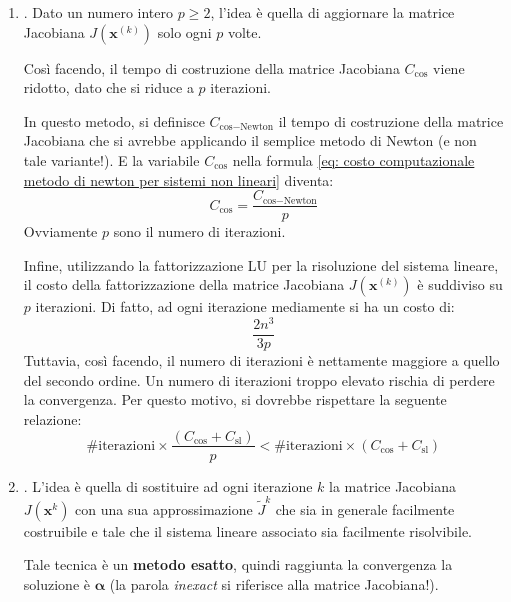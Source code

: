 \begin{enumerate}
	\item {}. Dato un numero intero $p \ge 2$, l'idea è quella di aggiornare la matrice Jacobiana $J\left(\mathbf{x}^{\left(k\right)}\right)$ solo ogni $p$ volte.
	
	Così facendo, il tempo di costruzione della matrice Jacobiana $C_{\text{cos}}$ viene ridotto, dato che si riduce a $p$ iterazioni.
	
	In questo metodo, si definisce $C_{\text{cos} - \text{Newton}}$ il tempo di costruzione della matrice Jacobiana che si avrebbe applicando il semplice metodo di Newton (e non tale variante!). E la variabile $C_{\text{cos}}$ nella formula \ref{eq: costo computazionale metodo di newton per sistemi non lineari} diventa:
	\begin{equation}
		C_{\text{cos}} = \dfrac{C_{\text{cos} - \text{Newton}}}{p}
	\end{equation}
	Ovviamente $p$ sono il numero di iterazioni.
	
	Infine, utilizzando la fattorizzazione LU per la risoluzione del sistema lineare, il costo della fattorizzazione della matrice Jacobiana $J\left(\mathbf{x}^{\left(k\right)}\right)$ è suddiviso su $p$ iterazioni. Di fatto, ad ogni iterazione mediamente si ha un costo di:
	\begin{equation*}
		\dfrac{2n^{3}}{3p}
	\end{equation*}
	Tuttavia, così facendo, il numero di iterazioni è nettamente maggiore a quello del secondo ordine. Un numero di iterazioni troppo elevato rischia di perdere la convergenza. Per questo motivo, si dovrebbe rispettare la seguente relazione:
	\begin{equation}
		\# \text{iterazioni} \times \dfrac{\left(C_{\text{cos}} + C_{\text{sl}}\right)}{p} < \# \text{iterazioni} \times \left(C_{\text{cos}} + C_{\text{sl}}\right)
	\end{equation}
	
	
	\item {}. L'idea è quella di sostituire ad ogni iterazione $k$ la matrice Jacobiana $J\left(\mathbf{x}^{k}\right)$ con una sua approssimazione $\tilde{J}^{k}$ che sia in generale facilmente costruibile e tale che il sistema lineare associato sia facilmente risolvibile.
	
	Tale tecnica è un \textbf{metodo esatto}, quindi raggiunta la convergenza la soluzione è $\mathbf{\alpha}$ (la parola \emph{inexact} si riferisce alla matrice Jacobiana!).
\end{enumerate}